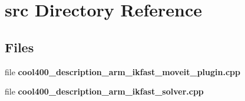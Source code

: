 \section{src Directory Reference}
\label{dir_68267d1309a1af8e8297ef4c3efbcdba}
\subsection*{Files}
\begin{DoxyCompactItemize}
\item 
file {\bfseries cool400\-\_\-description\-\_\-arm\-\_\-ikfast\-\_\-moveit\-\_\-plugin.\-cpp}
\item 
file {\bfseries cool400\-\_\-description\-\_\-arm\-\_\-ikfast\-\_\-solver.\-cpp}
\end{DoxyCompactItemize}
